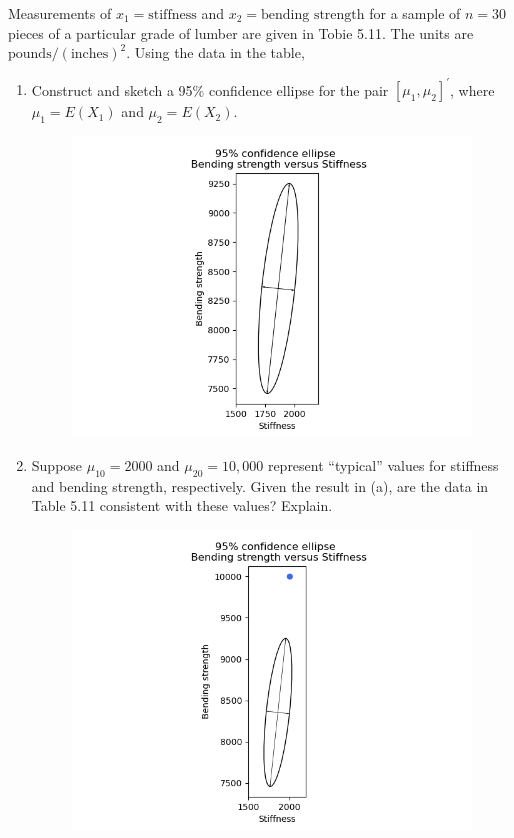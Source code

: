 Measurements of $x_{1} = \text{stiffness}$ and $x_{2} = \text{bending strength}$ for a sample of $n = 30$ pieces
of a particular grade of lumber are given in Tobie 5.11. The units are $\text{pounds}/{(\text{inches})}^{2}$.
Using the data in the table,

\begin{enumerate}[label= (\alph*)]
    \item Construct and sketch a 95\% confidence ellipse for the pair ${[\mu_{1}, \mu_{2}]}^{\prime}$, where $\mu_{1} = E(X_{1})$ and $\mu_{2} = E(X_{2})$.

    \begin{figure}[H]
        \centering
        \includegraphics[scale=0.70]{./python/chapter-5/Question-5-19-a.png}
    \end{figure}

    \item Suppose $\mu_{10} = 2000$ and $\mu_{20} = 10,000$ represent ``typical'' values for stiffness and
    bending strength, respectively. Given the result in (a), are the data in Table 5.11 consistent
    with these values? Explain.

    \begin{figure}[H]
        \centering
        \includegraphics[scale=0.70]{./python/chapter-5/Question-5-19-b.png}
    \end{figure}


\end{enumerate}
